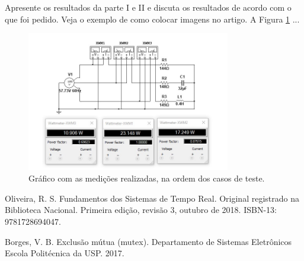 \documentclass[journal]{IEEEtran}
\begin{document}
Apresente os resultados da parte I e II e discuta os resultados de acordo com o que foi pedido. Veja o exemplo de como colocar imagens no artigo. A Figura \ref{fig1} ...

	\begin{figure}[h]
	\centering
	\includegraphics[width=3.5in]{Imagens/medidas.jpg}	
	\caption{Gráfico com as medições realizadas, na ordem dos casos de teste.}
	\label{fig1}
\end{figure}


\ifCLASSOPTIONcaptionsoff
  \newpage
\fi

\begin{thebibliography}{1}

Oliveira, R. S. Fundamentos dos Sistemas de Tempo Real. Original registrado na Biblioteca Nacional. Primeira edição, revisão 3, outubro de 2018. ISBN-13: 9781728694047.

Borges, V. B. Exclusão mútua (mutex). Departamento de Sistemas Eletrônicos Escola Politécnica da USP. 2017.

\end{thebibliography}

\end{document}
